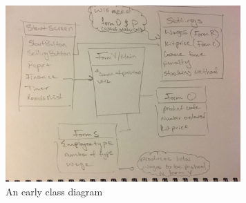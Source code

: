 \begin{figure}[!h]
\begin{center}
\includegraphics[width=9cm]{figures/class}
\end{center}
\caption{An early class diagram}
\label{fig:agilemethod}
\end{figure}
